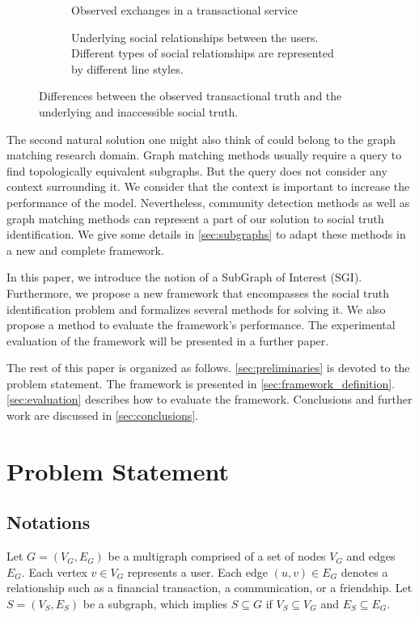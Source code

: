 \documentclass{llncs}
\begin{document}
\begin{figure*}[htbp!]
\centering
\begin{subfigure}[t]{0.45\textwidth}
\centering

\caption{Observed exchanges in a transactional service}%
\label{fig:sgi_type_a_w_context}
\end{subfigure}
\begin{subfigure}[t]{0.45\textwidth}
\centering

\caption{Underlying social relationships between the users.
Different types of social relationships are represented by different line styles.
}%
\label{fig:sgi_type_a_reality}
\end{subfigure}
\caption{Differences between the observed transactional truth and the underlying and inaccessible social truth.}%
\label{fig:reality_observed_truth}
\end{figure*}

The second natural solution one might also think of could belong to the graph matching research domain.
Graph matching methods usually require a query to find topologically equivalent subgraphs.
But the query does not consider any context surrounding it.
We consider that the context is important to increase the performance of the model.
Nevertheless, community detection methods as well as graph matching methods can represent a part of our solution to social truth identification.
We give some details in \autoref{sec:subgraphs} to adapt these methods in a new and complete framework.

In this paper, we introduce the notion of a SubGraph of Interest (SGI).
Furthermore, we propose a new framework that encompasses the social truth identification problem and formalizes several methods for solving it.
We also propose a method to evaluate the framework's performance.
The experimental evaluation of the framework will be presented in a further paper.

The rest of this paper is organized as follows.
\autoref{sec:preliminaries} is devoted to the problem statement.
The framework is presented in \autoref{sec:framework_definition}.
\autoref{sec:evaluation} describes how to evaluate the framework.
Conclusions and further work are discussed in \autoref{sec:conclusions}.

\section{Problem Statement}\label{sec:preliminaries}

\subsection{Notations}\label{sec:notations}
Let \(G = (V_G,E_G)\) be a multigraph comprised of a set of nodes \(V_G\) and edges \(E_G\).
Each vertex \(v \in V_G\) represents a user.
Each edge \((u,v) \in E_G\) denotes a relationship such as a financial transaction, a communication, or a friendship.
Let \(S = (V_S, E_S)\) be a subgraph, which implies \(S \subseteq G\) if \(V_S \subseteq V_G\) and \(E_S \subseteq E_G\).
\end{document}
